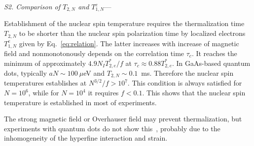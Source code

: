 \documentclass[prl,nobibnotes,twocolumn,aps,longbibliography,superscriptaddress,notoc]{revtex4-1}
\renewcommand{\section}[1]{\textit{#1}---}
\begin{document}
\section{S2. Comparison of $T_{2,N}$ and $T_{1,N}^e$}

Establishment of the nuclear spin temperature requires the thermalization time $T_{2,N}$ to be shorter than the nuclear spin polarization time by localized electrons $T_{1,N}^e$ given by Eq.~\eqref{eq:relation}. The latter increases with increase of magnetic field and nonmonotonously depends on the correlation time $\tau_c$. It reaches the minimum of approximately $4.9N_IT_{2,e}^*/f$ at $\tau_c\approx0.88T_{2,e}^*$. In GaAs-based quantum dots, typically $aN\sim100~\mu$eV and $T_{2,N}\sim0.1$~ms. Therefore the nuclear spin temperatures establishes at $N^{3/2}/f>10^7$. This condition is always satisfied for $N=10^6$, while for $N=10^4$ it requires $f<0.1$. This shows that the nuclear spin temperature is established in most of experiments.

The strong magnetic field or Overhauser field may prevent thermalization, but experiments with quantum dots do not show this~\cite{S_Chekhovich_constants,S_PhysRevB.97.041301}, probably due to the inhomogeneity of the hyperfine interaction and strain.
\end{document}
